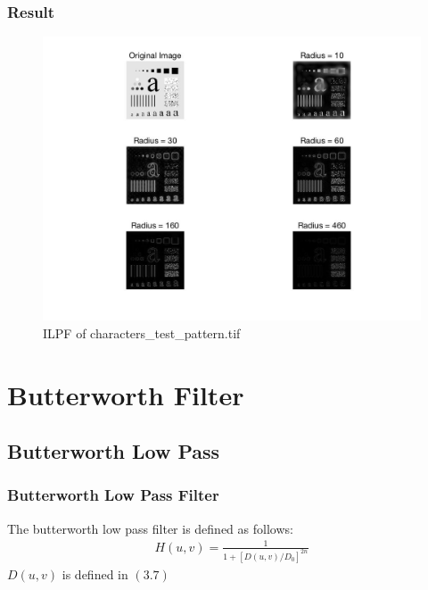 \documentclass[11pt,oneside]{book}
\begin{document}
\subsubsection{Result}
\begin{figure}[!htb]
   \centering  
   \includegraphics[width=1.0\textwidth]{images/3/IHPF.jpg}
   \caption{ILPF of characters\_test\_pattern.tif}  
\end{figure}
\newpage

\section{Butterworth Filter}
\subsection{Butterworth Low Pass}
\subsubsection{Butterworth Low Pass Filter}
The butterworth low pass filter is defined as follows:\\
\begin{align}
H(u,v)=\frac{1}{1+[D(u,v)/D_0]^{2n}}
\end{align}
$D(u,v)$ is defined in $(3.7)$
\end{document}
